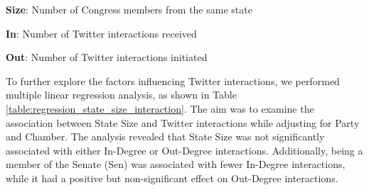 \documentclass[11pt]{article}
\begin{document}
\begin{table}[h]
\caption{Descriptive stats of Size, In, and Out stratified by Party and Chamber}
\label{table:desc_stats_party_chamber}
\begin{threeparttable}
\renewcommand{\TPTminimum}{\linewidth}
\begin{tablenotes}
\footnotesize
\item \textbf{Size}: Number of Congress members from the same state
\item \textbf{In}: Number of Twitter interactions received
\item \textbf{Out}: Number of Twitter interactions initiated
\end{tablenotes}
\end{threeparttable}
\end{table}


To further explore the factors influencing Twitter interactions, we performed multiple linear regression analysis, as shown in Table \ref{table:regression_state_size_interaction}. The aim was to examine the association between State Size and Twitter interactions while adjusting for Party and Chamber. The analysis revealed that State Size was not significantly associated with either In-Degree or Out-Degree interactions. Additionally, being a member of the Senate (Sen) was associated with fewer In-Degree interactions, while it had a positive but non-significant effect on Out-Degree interactions.
\end{document}
